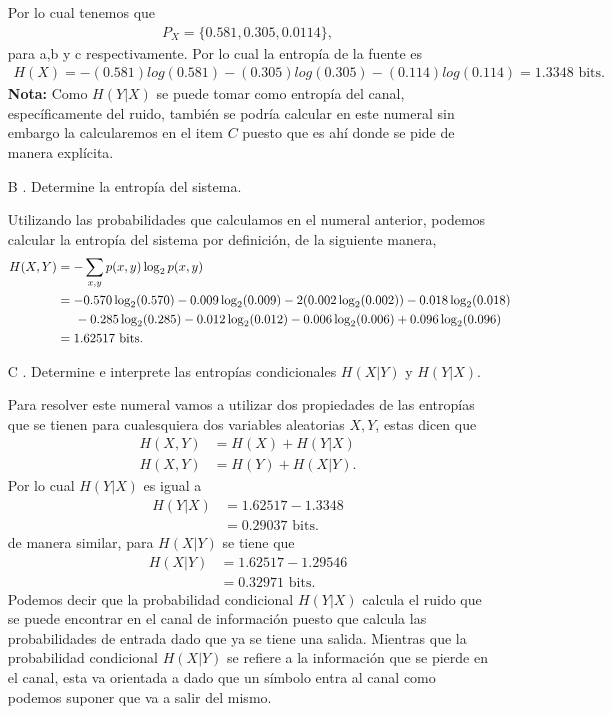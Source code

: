 \begin{enumerate}
\begin{sol}
Por lo cual tenemos que 
\begin{align*}
    P_X=\{0\text{.}581, 0\text{.}305, 0\text{.}0114\},
\end{align*}
para a,b y c respectivamente.
Por lo cual la entropía de la fuente es 
\begin{align*}
    H(X) =-(0.581)log(0.581) - (0.305)log(0.305) - (0.114)log(0.114) = 1.3348\text{ bits}
.\end{align*}
\textbf{Nota: }Como $H(Y|X)$ se puede tomar como entropía del canal, específicamente del ruido, también se podría calcular en este numeral sin embargo la calcularemos en el item $C$ puesto que es ahí donde se pide de manera explícita.
    \end{sol}
    \item[B]. Determine la entropía del sistema.\\
\begin{sol}
Utilizando las probabilidades que calculamos en el numeral anterior, podemos calcular la entropía del sistema por definición, de la siguiente manera,
    \begin{align*}
        H(X, Y) &= - \sum_{x,y} p(x, y) \log_2 p(x, y)\\
        &=-0.570 \log_2 (0.570)- 0.009 \log_2 (0.009)-2(0.002 \log_2 (0.002))-0.018 \log_2 (0.018) \\
        &\hspace{0.5cm}- 0.285 \log_2 (0.285)- 0.012 \log_2 (0.012)- 0.006 \log_2 (0.006) + 0.096 \log_2 (0.096) \\
        &=1.62517 \text{ bits}
 .\end{align*}
\end{sol}
\item[C]. Determine e interprete las entropías condicionales $H(X|Y)$ y $H(Y|X)$.\\
\begin{sol}
Para resolver este numeral vamos a utilizar dos propiedades de las entropías que se tienen para cualesquiera dos variables aleatorias $X,Y$, estas dicen que 
\begin{align*}
    H(X,Y)&=H(X)+H(Y|X)\\
     H(X,Y)&=H(Y)+H(X|Y)
.\end{align*}
Por lo cual $H(Y|X)$ es igual a 
\begin{align*}
    H(Y|X)&=1.62517-1.3348\\
    &=0.29037\text{ bits}
.\end{align*}
de manera similar, para $H(X|Y)$  se tiene que
\begin{align*}
    H(X|Y)&=1.62517- 1.29546\\
    &= 0.32971\text{ bits}
.\end{align*}
Podemos decir que la probabilidad condicional $H(Y|X)$ calcula el ruido que se puede encontrar en el canal de información puesto que calcula las probabilidades de entrada dado que ya se tiene una salida. Mientras que la probabilidad condicional $H(X|Y)$ se refiere a la información que se pierde en el canal, esta va orientada a dado que un símbolo entra al canal como podemos suponer que va a salir del mismo.


\end{sol}
\end{enumerate}
